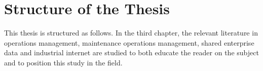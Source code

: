 

\section{Structure of the Thesis}
\label{section:structure} 

This thesis is structured as follows. In the third chapter, the relevant literature in operations management, maintenance operations management, shared enterprise data and industrial internet are studied to both educate the reader on the subject and to position this study in the field.


